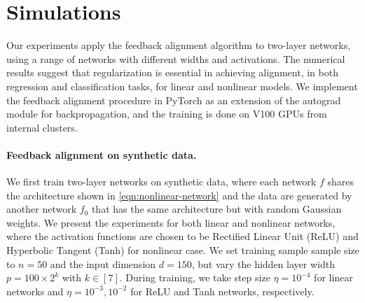 \section{Simulations}

Our experiments apply the feedback alignment algorithm to two-layer networks, using a range of networks with different widths and activations. The numerical results suggest that regularization is essential in achieving alignment, in both regression and classification tasks, for linear and nonlinear models. We implement the feedback alignment procedure in PyTorch as an extension of the autograd module for backpropagation, and the training is done on V100 GPUs from internal clusters.

\paragraph{Feedback alignment on synthetic data.}

We first train two-layer networks on synthetic data, where each network $f$ shares the architecture shown in \eqref{eqn:nonlinear-network} and the data are generated by another network $f_0$ that has the same architecture but with random Gaussian weights. We present the experiments for both linear and nonlinear networks, where the activation functions are chosen to be Rectified Linear Unit (ReLU) and Hyperbolic Tangent (Tanh) for nonlinear case. We set training sample sample size to $n=50$ and the input dimension $d=150$, but vary the hidden layer width $p = 100\times 2^k$ with $k\in[7]$. During training, we take step size $\eta = 10^{-4}$ for linear networks and $\eta = 10^{-3},10^{-2}$ for ReLU and Tanh networks, respectively.


